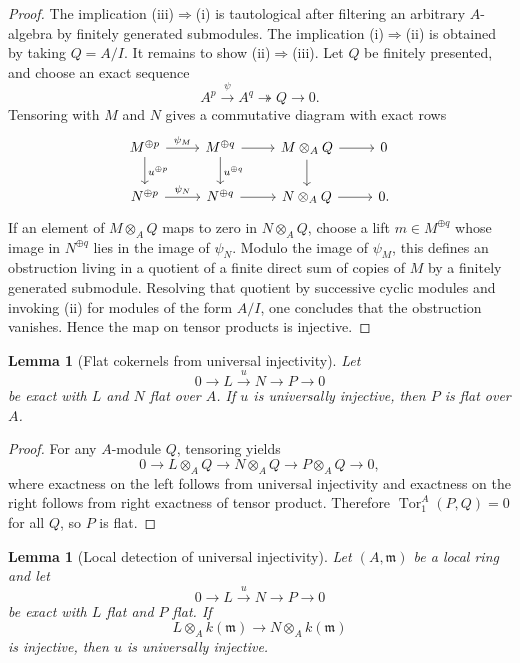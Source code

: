 \documentclass[11pt,oneside]{article}
\newtheorem{lemma}[theorem]{Lemma}
\newcommand{\Tor}{\operatorname{Tor}}
\newcommand{\ot}{\otimes}
\begin{document}
\begin{proof}
The implication (iii)$\Rightarrow$(i) is tautological after filtering an arbitrary $A$-algebra by finitely generated submodules.  The implication (i)$\Rightarrow$(ii) is obtained by taking $Q=A/I$.  It remains to show (ii)$\Rightarrow$(iii).  Let $Q$ be finitely presented, and choose an exact sequence
\[
A^p\xrightarrow{\psi} A^q\twoheadrightarrow Q\to 0.
\]
Tensoring with $M$ and $N$ gives a commutative diagram with exact rows
\[
\begin{tikzcd}
M^{\oplus p} \ar[r,"\psi_M"] \ar[d,"u^{\oplus p}"] & M^{\oplus q} \ar[r] \ar[d,"u^{\oplus q}"] & M\ot_A Q \ar[r] \ar[d] & 0 \\
N^{\oplus p} \ar[r,"\psi_N"] & N^{\oplus q} \ar[r] & N\ot_A Q \ar[r] & 0.
\end{tikzcd}
\]
If an element of $M\ot_A Q$ maps to zero in $N\ot_A Q$, choose a lift $m\in M^{\oplus q}$ whose image in $N^{\oplus q}$ lies in the image of $\psi_N$.  Modulo the image of $\psi_M$, this defines an obstruction living in a quotient of a finite direct sum of copies of $M$ by a finitely generated submodule.  Resolving that quotient by successive cyclic modules and invoking (ii) for modules of the form $A/I$, one concludes that the obstruction vanishes.  Hence the map on tensor products is injective.
\end{proof}

\begin{lemma}[Flat cokernels from universal injectivity]\label{lem:coker-flat-ui-2}
Let
\[
0\to L\xrightarrow{u} N\to P\to 0
\]
be exact with $L$ and $N$ flat over $A$.  If $u$ is universally injective, then $P$ is flat over $A$.
\end{lemma}

\begin{proof}
For any $A$-module $Q$, tensoring yields
\[
0\to L\ot_A Q\to N\ot_A Q\to P\ot_A Q\to 0,
\]
where exactness on the left follows from universal injectivity and exactness on the right follows from right exactness of tensor product.  Therefore $\Tor_1^A(P,Q)=0$ for all $Q$, so $P$ is flat.
\end{proof}

\begin{lemma}[Local detection of universal injectivity]\label{lem:local-ui}
Let $(A,\mathfrak m)$ be a local ring and let
\[
0\to L\xrightarrow{u} N\to P\to 0
\]
be exact with $L$ flat and $P$ flat.  If
\[
L\ot_A k(\mathfrak m)\longrightarrow N\ot_A k(\mathfrak m)
\]
is injective, then $u$ is universally injective.
\end{lemma}
\end{document}
